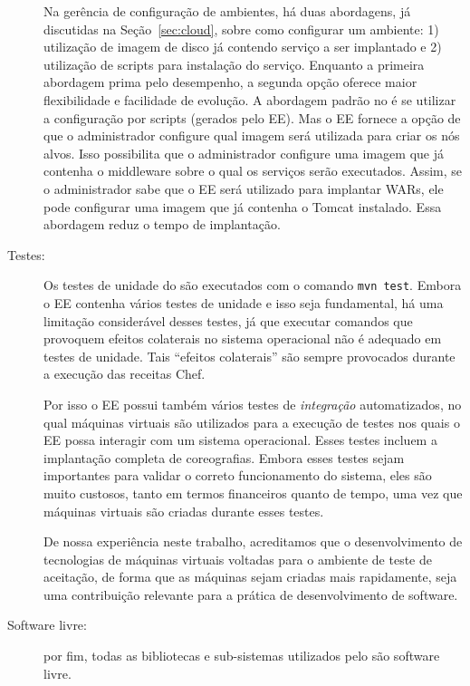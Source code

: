 \begin{description}
Na gerência de configuração de ambientes, há duas abordagens, 
já discutidas na Seção~\ref{sec:cloud}, sobre como configurar um ambiente:
1) utilização de imagem de disco já contendo serviço a ser implantado
e 2) utilização de scripts para instalação do serviço.
Enquanto a primeira abordagem prima pelo desempenho,
a segunda opção oferece maior flexibilidade e facilidade de evolução.
A abordagem padrão no \ee é se utilizar a configuração por scripts (gerados pelo EE).
Mas o EE fornece a opção de que o administrador configure qual imagem será
utilizada para criar os nós alvos.
Isso possibilita que o administrador configure uma imagem 
que já contenha o middleware sobre o qual os serviços serão executados.
Assim, se o administrador sabe que o EE será utilizado para implantar WARs,
ele pode configurar uma imagem que já contenha o Tomcat instalado.
Essa abordagem reduz o tempo de implantação.

\item [Testes:] 

Os testes de unidade do \ee são executados com o comando \texttt{mvn test}.
Embora o EE contenha vários testes de unidade e isso seja fundamental,
há uma limitação considerável desses testes, já que executar comandos que
provoquem efeitos colaterais no sistema operacional não é adequado
em testes de unidade. Tais ``efeitos colaterais'' são sempre provocados
durante a execução das receitas Chef.

Por isso o EE possui também vários testes de \emph{integração} automatizados,
no qual máquinas virtuais são utilizados para a execução de testes nos
quais o EE possa interagir com um sistema operacional.
Esses testes incluem a implantação completa de coreografias.
Embora esses testes sejam importantes para validar o correto funcionamento do sistema,
eles são muito custosos, tanto em termos financeiros quanto de tempo,
uma vez que máquinas virtuais são criadas durante esses testes.

De nossa experiência neste trabalho, acreditamos que
o desenvolvimento de tecnologias de máquinas virtuais
voltadas para o ambiente de teste de aceitação,
de forma que as máquinas sejam criadas mais rapidamente,
seja uma contribuição relevante para a prática de desenvolvimento de software.

\item [Software livre:] por fim, todas as bibliotecas e sub-sistemas
utilizados pelo \ee são software livre.

\end{description}

